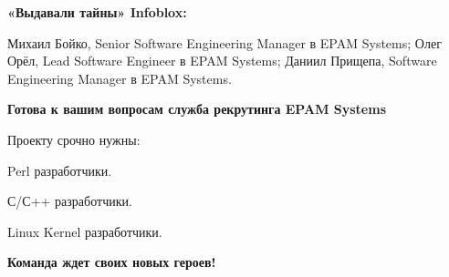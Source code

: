 \documentclass[10pt, a5paper]{article}
\begin{document}
\textbf{«Выдавали тайны» Infoblox:}

\noindent Михаил Бойко, Senior Software Engineering Manager в EPAM Systems;
Олег Орёл,  Lead Software Engineer в EPAM Systems;
Даниил Прищепа, Software Engineering Manager в EPAM Systems.



\textbf{Готова к вашим вопросам служба рекрутинга EPAM Systems}

Проекту срочно нужны:

Perl разработчики.

С/С++ разработчики.

Linux Kernel разработчики.


\textbf{Команда ждет своих новых героев!}
\end{document}
